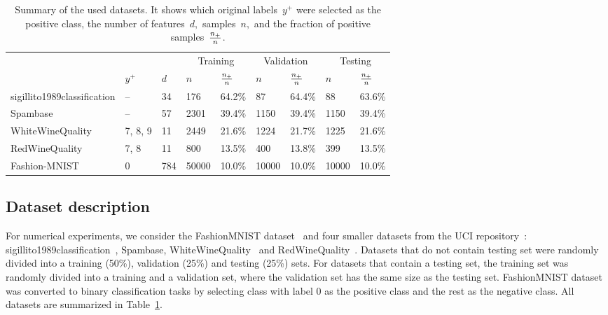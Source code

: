 \begin{table}[ht]
  \centering
  \begin{tabular}{@{}lllllllll@{}}
      \toprule
      &&& \multicolumn{2}{c}{Training}
        & \multicolumn{2}{c}{Validation}
        & \multicolumn{2}{c}{Testing} \\
      \cmidrule(lr){4-5} \cmidrule(lr){6-7} \cmidrule(l){8-9}
        & $y^+$
        & $d$
        & $n$
        & $\frac{n_{+}}{n}$
        & $n$
        & $\frac{n_{+}}{n}$
        & $n$
        & $\frac{n_{+}}{n}$ \\
      \midrule
      sigillito1989classification
        & -- & 34 & 176 & 64.2\% & 87 & 64.4\% & 88 & 63.6\% \\
      Spambase
        & -- & 57 & 2301 & 39.4\% & 1150 & 39.4\% & 1150 & 39.4\% \\
      WhiteWineQuality
        & 7, 8, 9 & 11 & 2449 & 21.6\% & 1224 & 21.7\% & 1225 & 21.6\% \\
      RedWineQuality
        & 7, 8 & 11 & 800 & 13.5\% & 400 & 13.8\% & 399 & 13.5\% \\
      Fashion-MNIST
        & 0 & 784 & 50000 & 10.0\% & 10000 & 10.0\% & 10000 & 10.0\% \\
      \bottomrule
  \end{tabular}
  \caption{Summary of the used datasets. It shows which original labels~$y^+$ were selected as the positive class, the number of features~$d,$ samples~$n,$ and the fraction of positive samples~$\frac{n_{+}}{n}$.}
  \label{tab:Datasets}
\end{table}

\subsection{Dataset description}

For numerical experiments, we consider the FashionMNIST dataset~\cite{xiao2017fashionmnist} and four smaller datasets from the UCI repository~\cite{dua2019uci}: sigillito1989classification~\cite{sigillito1989classification}, Spambase, WhiteWineQuality~\cite{cortez2009modeling} and RedWineQuality~\cite{cortez2009modeling}. Datasets that do not contain testing set were randomly divided into a training (50\%), validation (25\%) and testing (25\%) sets. For datasets that contain a testing set, the training set was randomly divided into a training and a validation set, where the validation set has the same size as the testing set. FashionMNIST dataset was converted to binary classification tasks by selecting class with label 0 as the positive class and the rest as the negative class. All datasets are summarized in Table~\ref{tab:Datasets}.

